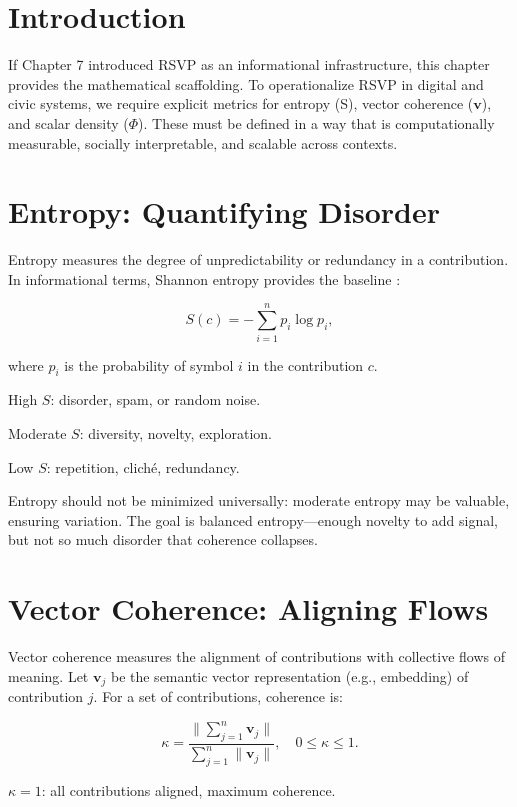 \documentclass{book}
\begin{document}
\section{Introduction}

If Chapter 7 introduced RSVP as an informational infrastructure, this chapter provides the mathematical scaffolding. To operationalize RSVP in digital and civic systems, we require explicit metrics for entropy (S), vector coherence (\(\mathbf{v}\)), and scalar density (\(\Phi\)). These must be defined in a way that is computationally measurable, socially interpretable, and scalable across contexts.

\section{Entropy: Quantifying Disorder}

Entropy measures the degree of unpredictability or redundancy in a contribution. In informational terms, Shannon entropy provides the baseline \cite{shannon1948}:

\[ S(c) = - \sum_{i=1}^{n} p_i \log p_i, \]

where \( p_i \) is the probability of symbol \( i \) in the contribution \( c \).

High \( S \): disorder, spam, or random noise.

Moderate \( S \): diversity, novelty, exploration.

Low \( S \): repetition, cliché, redundancy.

Entropy should not be minimized universally: moderate entropy may be valuable, ensuring variation. The goal is balanced entropy—enough novelty to add signal, but not so much disorder that coherence collapses.

\section{Vector Coherence: Aligning Flows}

Vector coherence measures the alignment of contributions with collective flows of meaning. Let \( \mathbf{v}_j \) be the semantic vector representation (e.g., embedding) of contribution \( j \). For a set of contributions, coherence is:

\[ \kappa = \frac{\|\sum_{j=1}^n \mathbf{v}_j\|}{\sum_{j=1}^n \|\mathbf{v}_j\|}, \quad 0 \leq \kappa \leq 1. \]

\( \kappa = 1 \): all contributions aligned, maximum coherence.
\end{document}
